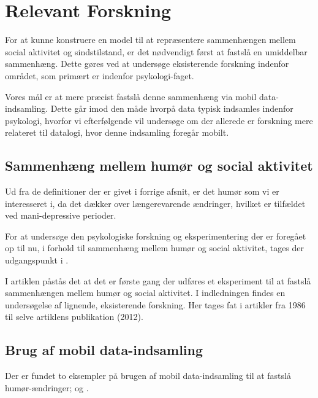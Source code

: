 
\section{Relevant Forskning}
For at kunne konstruere en model til at repræsentere sammenhængen mellem social aktivitet og sindstilstand, er det nødvendigt først at fastslå en umiddelbar sammenhæng.
Dette gøres ved at undersøge eksisterende forskning indenfor området, som primært er indenfor psykologi-faget.

Vores mål er at mere præcist fastslå denne sammenhæng via mobil data-indsamling.
Dette går imod den måde hvorpå data typisk indsamles indenfor psykologi, hvorfor vi efterfølgende vil undersøge om der allerede er forskning mere relateret til datalogi, hvor denne indsamling foregår mobilt.

\subsection{Sammenhæng mellem humør og social aktivitet}
Ud fra de definitioner der er givet i forrige afsnit, er det humør som vi er interesseret i, da det dækker over længerevarende ændringer, hvilket er tilfældet ved mani-depressive perioder.

For at undersøge den psykologiske forskning og eksperimentering der er foregået op til nu, i forhold til sammenhæng mellem humør og social aktivitet, tages der udgangspunkt i \citet{whelan}.

I artiklen påstås det at det er første gang der udføres et eksperiment til at fastslå sammenhængen mellem humør og social aktivitet.
I indledningen findes en undersøgelse af lignende, eksisterende forskning.
Her tages fat i artikler fra 1986 til selve artiklens publikation (2012).

\subsection{Brug af mobil data-indsamling}
Der er fundet to eksempler på brugen af mobil data-indsamling til at fastslå humør-ændringer; \citet{social_sensing} og \citet{social_sensing_2}.
